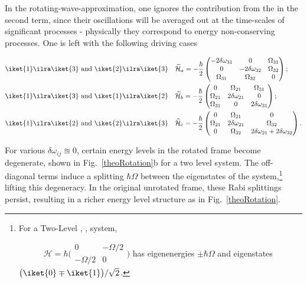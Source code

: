   \noindent  In   the  rotating-wave-approximation,  one   ignores  the
  contribution  from  the   in the  second term, since their oscillations
  will be  averaged out at  the time-scales of significant  processes -
  physically they correspond to energy non-conserving processes. One is
  left with the following driving cases

  \begin{equation}
    \begin{aligned}
      \label{rwaHamitlonianApprox}
      \iket{1}\ilra\iket{3}  \text{  and  } \iket{2}\ilra\iket{3}  &  \quad
      \widetilde{\mathcal{H}}_{a} = -\frac{\hbar}{2}
      \begin{pmatrix}
        -2\delta\omega_{31} & 0 & \Omega_{31}\\ 0 & -2\delta\omega_{32}
        & \Omega_{32} \\ \Omega_{31} & \Omega_{32} & 0
      \end{pmatrix};\\
      \iket{1}\ilra\iket{3}  \text{  and  } \iket{1}\ilra\iket{2}  &  \quad
      \widetilde{\mathcal{H}}_{b} = -\frac{\hbar}{2}
      \begin{pmatrix}
        0    &    \Omega_{21}    &    \Omega_{31}\\    \Omega_{21}    &
        2\delta\omega_{21} & 0 \\ \Omega_{31} & 0 & 2\delta\omega_{31}
      \end{pmatrix};\\
      \iket{1}\ilra\iket{2}  \text{  and  } \iket{2}\ilra\iket{3}  &  \quad
      \widetilde{\mathcal{H}}_{c} = -\frac{\hbar}{2}
      \begin{pmatrix}
        0 & \Omega_{21} & 0\\  \Omega_{21} & 2\delta\omega_{21} & \Omega_{32} \\
        0 & \Omega_{32} & 2\delta\omega_{21} + 2\delta\omega_{32}
      \end{pmatrix}.
    \end{aligned}
  \end{equation}

  \noindent For various $ \delta\omega_{ij} \approxeq 0$, certain energy levels
  in    the    rotated    frame    become    degenerate,    shown    in
  Fig.~\ref{theoRotation}b  for a  two level  system. The  off-diagonal
  terms induce a  splitting $ \hbar\Omega $ between  the eigenstates of
  the system,\footnote{For a Two-Level , , system,

    $\qquad\quad   \mathcal{H}   =   \hbar\big(\begin{smallmatrix}0   &
      -\Omega/2\\-\Omega/2&0\end{smallmatrix}\big) $  has eigenenergies
    $         \pm\hbar\Omega          $         and         eigenstates
    $   \big(\iket{0}\mp\iket{1}\big)/\sqrt{2}    $.}    lifting   this
  degeneracy.  In  the original unrotated frame,  these Rabi splittings
  persist,  resulting  in  a  richer   energy  level  structure  as  in
  Fig.~\ref{theoRotation}.

